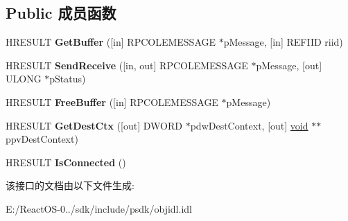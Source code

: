 \subsection*{Public 成员函数}
\begin{DoxyCompactItemize}
\item 
\mbox{\label{interface_i_rpc_channel_buffer_abf4677563858562a00562ac76684fbba}} 
H\+R\+E\+S\+U\+LT {\bfseries Get\+Buffer} (\mbox{[}in\mbox{]} R\+P\+C\+O\+L\+E\+M\+E\+S\+S\+A\+GE $\ast$p\+Message, \mbox{[}in\mbox{]} R\+E\+F\+I\+ID riid)
\item 
\mbox{\label{interface_i_rpc_channel_buffer_a57e0a6a0a82650e5f797f0e56f1e48e6}} 
H\+R\+E\+S\+U\+LT {\bfseries Send\+Receive} (\mbox{[}in, out\mbox{]} R\+P\+C\+O\+L\+E\+M\+E\+S\+S\+A\+GE $\ast$p\+Message, \mbox{[}out\mbox{]} U\+L\+O\+NG $\ast$p\+Status)
\item 
\mbox{\label{interface_i_rpc_channel_buffer_acf009da970cab4224fc32f442a0637f0}} 
H\+R\+E\+S\+U\+LT {\bfseries Free\+Buffer} (\mbox{[}in\mbox{]} R\+P\+C\+O\+L\+E\+M\+E\+S\+S\+A\+GE $\ast$p\+Message)
\item 
\mbox{\label{interface_i_rpc_channel_buffer_ac1481811f6aab9088ebf1ea263287ad0}} 
H\+R\+E\+S\+U\+LT {\bfseries Get\+Dest\+Ctx} (\mbox{[}out\mbox{]} D\+W\+O\+RD $\ast$pdw\+Dest\+Context, \mbox{[}out\mbox{]} \hyperlink{interfacevoid}{void} $\ast$$\ast$ppv\+Dest\+Context)
\item 
\mbox{\label{interface_i_rpc_channel_buffer_aa046d3484f3484c86e13f495efcfde3d}} 
H\+R\+E\+S\+U\+LT {\bfseries Is\+Connected} ()
\end{DoxyCompactItemize}


该接口的文档由以下文件生成\+:\begin{DoxyCompactItemize}
\item 
E\+:/\+React\+O\+S-\/0../sdk/include/psdk/objidl.\+idl\end{DoxyCompactItemize}
